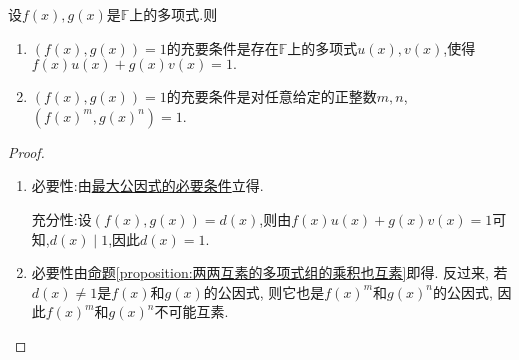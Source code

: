 \documentclass[lang=cn,newtx,10pt,scheme=chinese]{elegantbook}
\begin{document}
\begin{theorem}[多项式互素的充要条件]\label{theorem:多项式互素的充要条件}
设\(f(x),g(x)\)是\(\mathbb{F}\)上的多项式.则
\begin{enumerate}[(1)]
\item \((f(x),g(x)) = 1\)的充要条件是存在\(\mathbb{F}\)上的多项式\(u(x),v(x)\),使得$f(x)u(x)+g(x)v(x)=1.$
\item \((f(x),g(x)) = 1\)的充要条件是对任意给定的正整数\(m,n\), \((f(x)^m,g(x)^n)=1\).
\end{enumerate}
\end{theorem}
\begin{proof}
\begin{enumerate}
\item 必要性:由\hyperref[theorem:最大公因式的必要条件]{最大公因式的必要条件}立得.

充分性:设$(f(x),g(x))=d(x)$,则由$f(x)u(x)+g(x)v(x)=1$可知,$d(x)\mid 1$,因此$d(x)=1.$

\item 必要性由\hyperref[proposition:两两互素的多项式组的乘积也互素]{命题\ref{proposition:两两互素的多项式组的乘积也互素}}即得. 反过来, 若\(d(x)\neq 1\)是\(f(x)\)和\(g(x)\)的公因式, 则它也是\(f(x)^m\)和\(g(x)^n\)的公因式, 因此\(f(x)^m\)和\(g(x)^n\)不可能互素.
\end{enumerate}
\end{proof}
\end{document}
